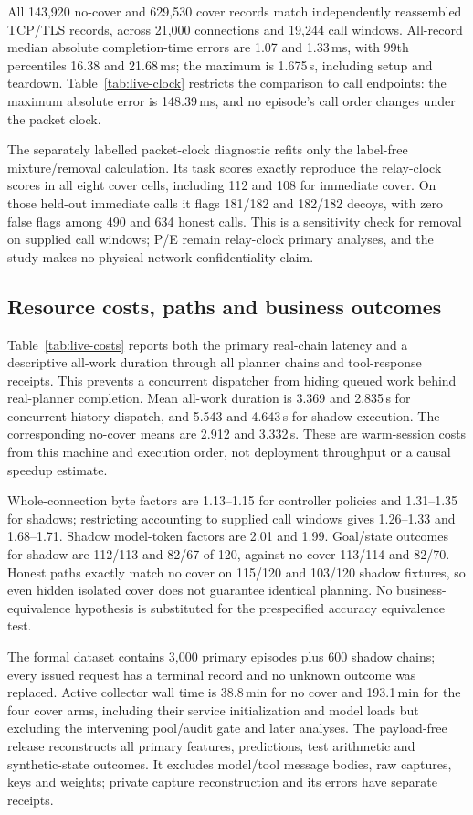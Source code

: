 All 143,920 no-cover and 629,530 cover records match independently reassembled TCP/TLS records, across 21,000 connections and 19,244 call windows. All-record median absolute completion-time errors are 1.07 and 1.33\,ms, with 99th percentiles 16.38 and 21.68\,ms; the maximum is 1.675\,s, including setup and teardown. Table~\ref{tab:live-clock} restricts the comparison to call endpoints: the maximum absolute error is 148.39\,ms, and no episode's call order changes under the packet clock.

The separately labelled packet-clock diagnostic refits only the label-free mixture/removal calculation. Its task scores exactly reproduce the relay-clock scores in all eight cover cells, including 112 and 108 for immediate cover. On those held-out immediate calls it flags 181/182 and 182/182 decoys, with zero false flags among 490 and 634 honest calls. This is a sensitivity check for removal on supplied call windows; P/E remain relay-clock primary analyses, and the study makes no physical-network confidentiality claim.




\subsection{Resource costs, paths and business outcomes}
Table~\ref{tab:live-costs} reports both the primary real-chain latency and a descriptive all-work duration through all planner chains and tool-response receipts. This prevents a concurrent dispatcher from hiding queued work behind real-planner completion. Mean all-work duration is 3.369 and 2.835\,s for concurrent history dispatch, and 5.543 and 4.643\,s for shadow execution. The corresponding no-cover means are 2.912 and 3.332\,s. These are warm-session costs from this machine and execution order, not deployment throughput or a causal speedup estimate.

Whole-connection byte factors are 1.13--1.15 for controller policies and 1.31--1.35 for shadows; restricting accounting to supplied call windows gives 1.26--1.33 and 1.68--1.71. Shadow model-token factors are 2.01 and 1.99. Goal/state outcomes for shadow are 112/113 and 82/67 of 120, against no-cover 113/114 and 82/70. Honest paths exactly match no cover on 115/120 and 103/120 shadow fixtures, so even hidden isolated cover does not guarantee identical planning. No business-equivalence hypothesis is substituted for the prespecified accuracy equivalence test.

The formal dataset contains 3,000 primary episodes plus 600 shadow chains; every issued request has a terminal record and no unknown outcome was replaced. Active collector wall time is 38.8\,min for no cover and 193.1\,min for the four cover arms, including their service initialization and model loads but excluding the intervening pool/audit gate and later analyses. The payload-free release reconstructs all primary features, predictions, test arithmetic and synthetic-state outcomes. It excludes model/tool message bodies, raw captures, keys and weights; private capture reconstruction and its errors have separate receipts.



